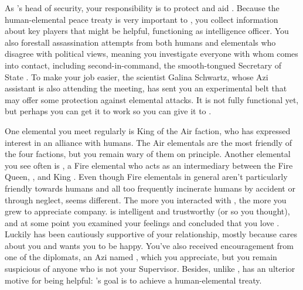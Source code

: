 \documentclass[char]{elementals}
\begin{document}
As \cLeader{}'s head of security, your responsibility is to protect and aid \cLeader{\them}.  Because the human-elemental peace treaty is very important to \cLeader{\them}, you collect information about key players that might be helpful, functioning as \cLeader{\their} intelligence officer.  You also forestall assassination attempts from both humans and elementals who disagree with \cLeader{\their} political views, meaning you investigate everyone with whom \cLeader{\they} comes into contact, including \cLeader{\their} second-in-command, the smooth-tongued Secretary of State \cDema{\intro}.  To make your job easier, the scientist Galina Schwartz, whose Azi assistant \cScientist{\intro} is also attending the meeting, has sent you an experimental belt that may offer some protection against elemental attacks.  It is not fully functional yet, but perhaps you can get it to work so you can give it to \cLeader{}.

One elemental you meet regularly is King \cKing{\intro} of the Air faction, who has expressed interest in an alliance with humans.  The Air elementals are the most friendly of the four factions, but you remain wary of them on principle.  Another elemental you see often is \cJuliet{\intro}, a Fire elemental who acts as an intermediary between the Fire Queen, \cQueen{\intro}, and King \cKing{}.  Even though Fire elementals in general aren't particularly friendly towards humans and all too frequently incinerate humans by accident or through neglect, \cJuliet{} seems different.  The more you interacted with \cJuliet{\them}, the more you grew to appreciate \cJuliet{\their} company.  \cJuliet{\They} is intelligent and trustworthy (or so you thought), and at some point you examined your feelings and concluded that you love \cJuliet{\them}.  Luckily \cLeader{} has been cautiously supportive of your relationship, mostly because \cLeader{\they} cares about you and wants you to be happy.  You've also received encouragement from one of the diplomats, an Azi named \cDiplomat{\intro}, which you appreciate, but you remain suspicious of anyone who is not your Supervisor.  Besides, unlike \cLeader{}, \cDiplomat{\they} has an ulterior motive for being helpful: \cDiplomat{}'s goal is to achieve a human-elemental treaty.
\end{document}
